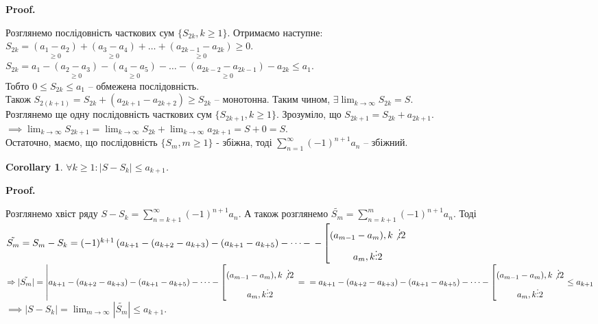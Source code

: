 \documentclass[a4paper, 10pt]{article}
\makeatletter
\def\huge{\displaystyle}
\theoremstyle{theoremdd}
\theoremstyle{theoremdd}
\theoremstyle{theoremdd}
\theoremstyle{theoremdd}
\theoremstyle{theoremdd}
\theoremstyle{theoremdd}
\theoremstyle{theoremdd}
\theoremstyle{theoremdd}
\theoremstyle{theoremdd}
\newtheorem{corollary}[theorem]{Corollary}
\renewenvironment{proof}[1][Proof.\\]{\par
\pushQED{\hfill \qed}%
\normalfont \topsep6\p@\@plus6\p@\relax
\trivlist
\item\relax
{\bfseries
#1\@addpunct{.}}\hspace\labelsep\ignorespaces
}{%
\popQED\endtrivlist\@endpefalse
}
\makeatother
\begin{document}
\begin{proof}
Розглянемо послідовність часткових сум $\{S_{2k}, k \geq 1 \}$. Отримаємо наступне:\\
$S_{2k} = \underset{\geq 0}{(a_1 - a_2)} + \underset{\geq 0}{(a_3 - a_4)} + \dots + \underset{\geq 0}{(a_{2k-1} - a_{2k})} \geq 0$.\\
$S_{2k} = a_1 - \underset{\geq 0}{(a_2 - a_3)} - \underset{\geq 0}{(a_4 - a_5)} - \dots - \underset{\geq 0}{(a_{2k-2} - a_{2k-1})} - a_{2k} \leq a_1$.\\
Тобто $0 \leq S_{2k} \leq a_1$ -- обмежена послідовність.\\
Також $S_{2(k+1)} = S_{2k} + (a_{2k+1}-a_{2k+2}) \geq S_{2k}$ -- монотонна. Таким чином, $\exists \huge \lim_{k \to \infty} S_{2k} = S$.\\
Розглянемо ще одну послідовність часткових сум $\{S_{2k+1}, k \geq 1\}$. Зрозуміло, що $S_{2k+1} = S_{2k} + a_{2k+1}$.\\
$\implies \huge \lim_{k \to \infty} S_{2k+1} = \lim_{k \to \infty} S_{2k} + \lim_{k \to \infty} a_{2k+1} = S + 0 = S$. \\
Остаточно, маємо, що послідовність $\{S_m, m \geq 1\}$ - збіжна, тоді $\huge \sum_{n=1}^\infty (-1)^{n+1}a_n$ -- збіжний.
\end{proof}

\begin{corollary}
$\forall k \geq 1: |S-S_k| \leq a_{k+1}$.
\end{corollary}

\begin{proof}
Розглянемо хвіст ряду $S-S_k = \huge \sum_{n=k+1}^{\infty} (-1)^{n+1}a_n$. А також розглянемо $\tilde{S_m} = \huge \sum_{n=k+1}^{m} (-1)^{n+1}a_n$. Тоді\\
$\tilde{S_m} = S_m - S_k = (-1)^{k+1} \left(a_{k+1}-(a_{k+2}-a_{k+3})-(a_{k+1}-a_{k+5}) - \dots - \right. \left. - \left[ \begin{gathered} (a_{m-1}-a_m), k \not \vdots 2 \\ a_m, k \vdots 2 \end{gathered} \right. \right.$\\
$\Rightarrow |\tilde{S_m}| = \left|a_{k+1}-(a_{k+2}-a_{k+3})-(a_{k+1}-a_{k+5}) - \dots - \left[ \begin{gathered} (a_{m-1}-a_m), k \not \vdots 2 \\ a_m, k \vdots 2 \end{gathered} \right. \right. = \\
= a_{k+1}-(a_{k+2}-a_{k+3})-(a_{k+1}-a_{k+5}) - \dots - \left[ \begin{gathered} (a_{m-1}-a_m), k \not \vdots 2 \\ a_m, k \vdots 2 \end{gathered} \right. \leq a_{k+1}$\\
$\implies |S - S_k| = \huge \lim_{m \to \infty} |\tilde{S_m}| \leq a_{k+1}$. 
\end{proof}
\end{document}
